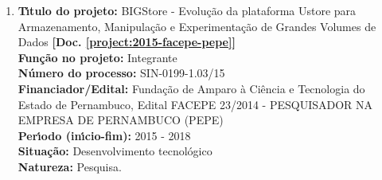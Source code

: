 \documentclass[a4paper,oneside,10pt]{article}
\begin{document}
\begin{enumerate}
\renewcommand{\labelenumi}{{\large\bfseries\arabic{enumi}.}}

\item \textbf{T\'{\i}tulo do projeto:} BIGStore - Evolução da plataforma Ustore para Armazenamento, Manipulação e Experimentação de Grandes Volumes de Dados \textbf{[Doc. \ref{project:2015-facepe-pepe}]}\\
      \textbf{Fun\c{c}\~{a}o no projeto:} Integrante\\
      \textbf{N\'{u}mero do processo:} SIN-0199-1.03/15\\
      \textbf{Financiador/Edital:} Fundação de Amparo à Ciência e Tecnologia do Estado de Pernambuco, Edital FACEPE 23/2014 - PESQUISADOR NA EMPRESA DE PERNAMBUCO (PEPE)\\
      \textbf{Per\'{\i}odo (in\'{\i}cio-fim):} 2015 - 2018\\
      \textbf{Situação:} Desenvolvimento tecnológico\\
      \textbf{Natureza:} Pesquisa.


\end{enumerate}
\end{document}
